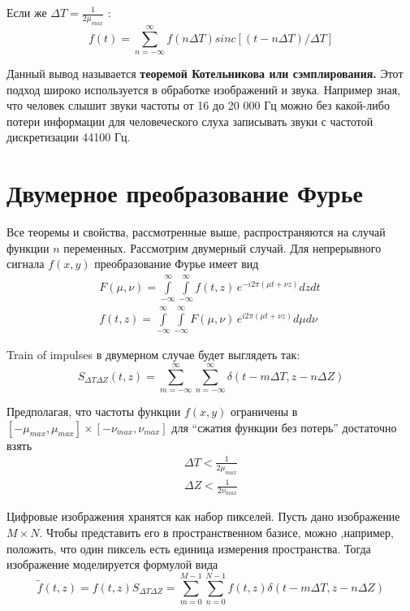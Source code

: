 \documentclass[oneside,final,14pt]{extreport}
\begin{document}
Если же $ \varDelta T = \frac{1}{2 \mu_{max}} $ :
\begin{equation}
f(t) 
=
\sum_{ n = - \infty}^{\infty}
f(n \varDelta T ) 
sinc[ (t - n \varDelta T) / \varDelta T	]  
\end{equation}

Данный вывод называется \textbf{теоремой Котельникова или сэмплирования.} 
Этот подход широко используется в обработке изображений и звука. Например зная, что человек слышит звуки частоты от 16 до 20 000 Гц можно без какой-либо потери информации для человеческого слуха записывать звуки с частотой дискретизации 44100 Гц.

\section{Двумерное преобразование Фурье}
Все теоремы и свойства, рассмотренные выше, распространяются на случай функции $n$ переменных. Рассмотрим двумерный случай. Для непрерывного сигнала $f(x,y)$ преобразование Фурье имеет вид
\begin{gather}
\label{FFT_2d}
F(\mu,\nu)
=
\int\limits_{-\infty}^{\infty}
\int\limits_{-\infty}^{\infty}
f(t,z) \,
e^{-i 2 \pi( \mu t + \nu z)}
dz dt~
\\
\label{IFFT_2d}
f(t,z)
=
\int\limits_{-\infty}^{\infty}
\int\limits_{-\infty}^{\infty}
F(\mu,\nu) \,
e^{i 2 \pi( \mu t + \nu z)}
d\mu d\nu~
\end{gather}

Train of impulses в двумерном случае будет выглядеть так:
\begin{equation}
S_{ \varDelta T \varDelta Z }
(t,z)
=
\sum_
{ m = - \infty}^{\infty}
\sum_
{ n = - \infty}^{\infty}
\delta(
t - m \varDelta T,
z - n \varDelta Z
)
\end{equation}

Предполагая, что частоты функции $f(x,y)$ ограничены в $
[- \mu_{max},\mu_{max}] 
\times
[- \nu_{max},\nu_{max}] 
$
для “сжатия функции без потерь” достаточно взять
\begin{gather}
\varDelta T 
<
\frac{1}{2 \mu_{max}}
\\
\varDelta Z 
<
\frac{1}{2 \nu_{max}}
\label{Kotelnicov_imparity}
\end{gather}

Цифровые изображения хранятся как набор пикселей. Пусть дано изображение $M\times N$. Чтобы представить его в пространственном базисе, можно ,например, положить, что один пиксель есть единица измерения пространства. Тогда изображение моделируется формулой вида
\begin{equation}
\tilde{f}(t,z) 
=
f(t,z)
S_{ \varDelta T \varDelta Z }
=
\sum_
{ m =  0}^{M-1}
\sum_
{ n =  0}^{N-1}
f(t,z)\delta(
t - m \varDelta T,
z - n \varDelta Z
)
\label{sample_2d}
\end{equation}
\end{document}
